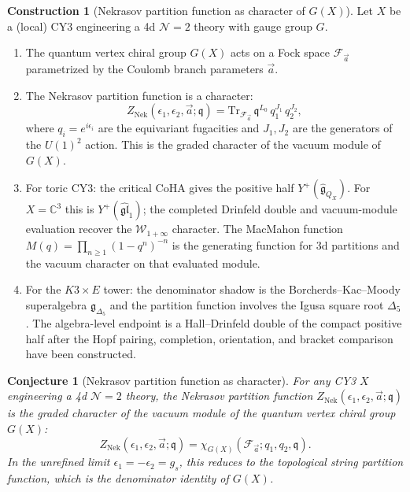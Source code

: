 \documentclass[11pt]{article}
\newtheorem{conjecture}[theorem]{Conjecture}
\theoremstyle{definition}
\newtheorem{construction}[theorem]{Construction}
\theoremstyle{remark}
\newcommand{\cF}{\mathcal{F}}
\newcommand{\cN}{\mathcal{N}}
\newcommand{\cW}{\mathcal{W}}
\newcommand{\frakg}{\mathfrak{g}}
\newcommand{\Tr}{\mathrm{Tr}}
\newcommand{\Nek}{\mathrm{Nek}}
\begin{document}
\begin{construction}[Nekrasov partition function as character of $G(X)$]
 \label{constr:nekrasov-character}
 Let $X$ be a (local) CY3 engineering a 4d $\cN=2$ theory with gauge group $G$.
 \begin{enumerate}[label=(\roman*)]
 \item The quantum vertex chiral group $G(X)$ acts on a Fock space $\cF_{\vec{a}}$ parametrized
 by the Coulomb branch parameters $\vec{a}$.
 \item The Nekrasov partition function is a character:
 \begin{equation}
 \label{eq:nekrasov-character}
 Z_{\Nek}(\epsilon_1, \epsilon_2, \vec{a}; \mathfrak{q}) = \Tr_{\cF_{\vec{a}}} \, \mathfrak{q}^{L_0} \, q_1^{J_1} \, q_2^{J_2},
 \end{equation}
 where $q_i = e^{i\epsilon_i}$ are the equivariant fugacities and $J_1, J_2$ are the generators
 of the $U(1)^2$ action. This is the graded character of the vacuum module of $G(X)$.
 \item For toric CY3: the critical CoHA gives the positive half $Y^+(\widehat{\frakg}_{Q_X})$. For $X = \mathbb{C}^3$ this is $Y^+(\widehat{\mathfrak{gl}}_1)$; the completed Drinfeld double and vacuum-module evaluation recover the $\cW_{1+\infty}$ character. The MacMahon function
 $M(q) = \prod_{n \geq 1} (1-q^n)^{-n}$ is the generating function for 3d partitions and the vacuum character on that evaluated module.
 \item For the $K3 \times E$ tower: the denominator shadow is the Borcherds--Kac--Moody superalgebra $\frakg_{\Delta_5}$ and the partition function involves the Igusa square root $\Delta_5$. The algebra-level endpoint is a Hall--Drinfeld double of the compact positive half after the Hopf pairing, completion, orientation, and bracket comparison have been constructed.
 \end{enumerate}
\end{construction}

\begin{conjecture}[Nekrasov partition function as character]
 \label{conj:nekrasov-character}
 For any CY3 $X$ engineering a 4d $\cN=2$ theory, the Nekrasov partition function
 $Z_{\Nek}(\epsilon_1, \epsilon_2, \vec{a}; \mathfrak{q})$ is the graded character of the
 vacuum module of the quantum vertex chiral group $G(X)$:
 \begin{equation}
 \label{eq:nekrasov-character-conjecture}
 Z_{\Nek}(\epsilon_1, \epsilon_2, \vec{a}; \mathfrak{q}) = \chi_{G(X)}(\cF_{\vec{a}}; q_1, q_2, \mathfrak{q}).
 \end{equation}
 In the unrefined limit $\epsilon_1 = -\epsilon_2 = g_s$, this reduces to the topological string
 partition function, which is the denominator identity of $G(X)$.
\end{conjecture}
\end{document}
